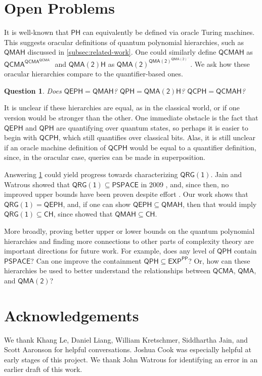 \documentclass[11pt]{article}
\newtheorem{question}[theorem]{Question}
\theoremstyle{definition}
\newcommand{\class}[1]{\ensuremath{\mathsf{#1}}\xspace}
\newcommand{\EXP}{\class{EXP}}
\newcommand{\PSPACE}{\class{PSPACE}}
\newcommand{\QCMA}{\class{QCMA}}
\newcommand{\QMA}{\class{QMA}}
\newcommand{\QMAk}[1][k]{\class{QMA(#1)}}
\newcommand{\QMAtwo}{\QMAk[2]}
\newcommand{\QRGk}[1][k]{\class{QRG(#1)}}
\newcommand{\QRGone}{\QRGk[1]}
\newcommand{\CH}{\class{CH}}
\newcommand{\PP}{\class{PP}}
\newcommand{\PH}{\class{PH}}
\newcommand{\QCPH}{\class{QCPH}}
\newcommand{\QPH}{\class{QPH}}
\newcommand{\QEPH}{\class{QEPH}}
\newcommand{\QMAH}{\class{QMAH}}
\newcommand{\QCMAH}{\class{QCMAH}}
\begin{document}
\section{Open Problems}\label{sec:openproblems}

It is well-known that $\PH$ can equivalently be defined via oracle Turing machines. 
This suggests oracular definitions of quantum polynomial hierarchies, such as $\QMAH$ discussed in \cref{subsec:related-work}. 
One could similarly define $\mathsf{\QCMAH}$ as $\QCMA^{\QCMA^{\QCMA^{\ldots}}}$ and $\mathsf{QMA(2)H}$ as $\QMAtwo^{\QMAtwo^{\QMAtwo^{\ldots}}}$.
We ask how these oracular hierarchies compare to the quantifier-based ones.

\begin{question}\label{question:oracle-vs-quantifier}
    Does $\QEPH = \QMAH$? $\QPH = \mathsf{QMA(2)H}$? $\QCPH = \mathsf{QCMAH}$?
\end{question}

It is unclear if these hierarchies are equal, as in the classical world, or if one version would be stronger than the other.
One immediate obstacle is the fact that $\QEPH$ and $\QPH$ are quantifying over quantum states, so perhaps it is easier to begin with $\QCPH$, which still quantifies over classical bits. 
Alas, it is still unclear if an oracle machine definition of $\QCPH$ would be equal to a quantifier definition, since, in the oracular case, queries can be made in superposition.


Answering \cref{question:oracle-vs-quantifier} could yield progress towards characterizing $\QRGone$.
Jain and Watrous showed that $\QRGone \subseteq \PSPACE$ in 2009 \cite{jain2009parallel}, and, since then, no improved upper bounds have been proven despite effort \cite{ghosh2023complexity}. 
Our work shows that $\QRGone = \QEPH$, and, if one can show $\QEPH \subseteq \QMAH$, then that would imply $\QRGone \subseteq \CH$, since \cite{V18_BQPHthesis} showed that $\QMAH \subseteq \CH$.

More broadly, proving better upper or lower bounds on the quantum polynomial hierarchies and finding more connections to other parts of complexity theory are important directions for future work. 
For example, does any level of $\QPH$ contain $\PSPACE$? 
Can one improve the containment $\QPH \subseteq \EXP^\PP$?
Or, how can these hierarchies be used to better understand the relationships between $\QCMA$, $\QMA$, and $\QMAtwo$?




\section*{Acknowledgements}
We thank Khang Le, Daniel Liang, William Kretschmer, Siddhartha Jain, and Scott Aaronson for helpful conversations. Joshua Cook was especially helpful at early stages of this project. We thank John Watrous for identifying an error in an earlier draft of this work.




\end{document}
